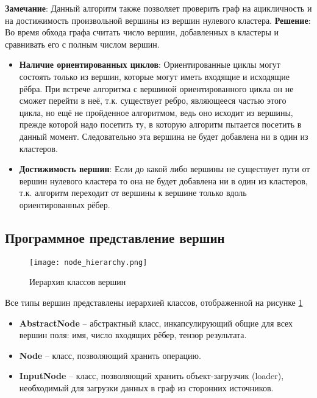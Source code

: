 \textbf{Замечание}: Данный алгоритм также позволяет проверить граф на ацикличность и на достижимость произвольной вершины из вершин нулевого кластера. \newline
\textbf{Решение}: Во время обхода графа считать число вершин, добавленных в кластеры и сравнивать его с полным числом вершин.
\begin{itemize}
	\item \textbf{Наличие ориентированных циклов}: Ориентированные циклы могут состоять только из вершин, которые могут иметь входящие и исходящие рёбра. При встрече алгоритма с вершиной ориентированного цикла он не сможет перейти в неё, т.к. существует ребро, являющееся частью этого цикла, но ещё не пройденное алгоритмом, ведь оно исходит из вершины, прежде которой надо посетить ту, в которую алгоритм пытается посетить в данный момент. Следовательно эта вершина не будет добавлена ни в один из кластеров.
	\item \textbf{Достижимость вершин}: Если до какой либо вершины не существует пути от вершин нулевого кластера то она не будет добавлена ни в один из кластеров, т.к. алгоритм переходит от вершины к вершине только вдоль ориентированных рёбер.
\end{itemize}
\subsection{Программное представление вершин}
\label{sec:softwarepresentationnodes}
\begin{figure}[ht]
    \centering
    \texttt{[image: node\_hierarchy.png]}
    \caption{Иерархия классов вершин}
    \label{fig:nodes_hierarchy}
\end{figure}
Все типы вершин представлены иерархией классов, отображенной на рисунке \ref{fig:nodes_hierarchy}
\begin{itemize}
    \item \textbf{AbstractNode} -- абстрактный класс, инкапсулирующий общие для всех вершин поля: имя, число входящих рёбер, тензор результата.
    \item \textbf{Node} -- класс, позволяющий хранить операцию.
    \item \textbf{InputNode} -- класс, позволяющий хранить объект-загрузчик (loader), необходимый для загрузки данных в граф из сторонних источников.
\end{itemize}
